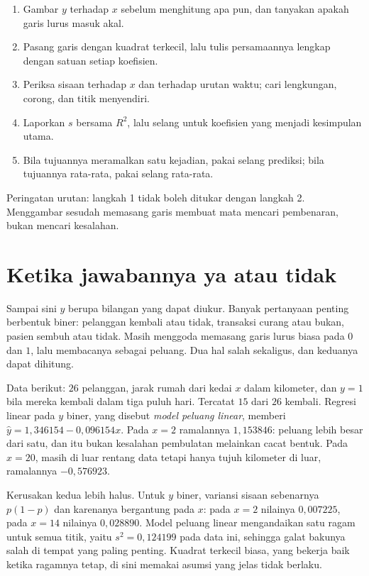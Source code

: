 \begin{resep}
\begin{enumerate}
  \item Gambar $y$ terhadap $x$ sebelum menghitung apa pun, dan tanyakan apakah garis
        lurus masuk akal.
  \item Pasang garis dengan kuadrat terkecil, lalu tulis persamaannya lengkap dengan
        satuan setiap koefisien.
  \item Periksa sisaan terhadap $x$ dan terhadap urutan waktu; cari lengkungan,
        corong, dan titik menyendiri.
  \item Laporkan $s$ bersama $R^2$, lalu selang untuk koefisien yang menjadi
        kesimpulan utama.
  \item Bila tujuannya meramalkan satu kejadian, pakai selang prediksi; bila tujuannya
        rata-rata, pakai selang rata-rata.
\end{enumerate}
Peringatan urutan: langkah 1 tidak boleh ditukar dengan langkah 2. Menggambar sesudah
memasang garis membuat mata mencari pembenaran, bukan mencari kesalahan.
\end{resep}

\section{Ketika jawabannya ya atau tidak}

Sampai sini $y$ berupa bilangan yang dapat diukur. Banyak pertanyaan penting berbentuk
biner: pelanggan kembali atau tidak, transaksi curang atau bukan, pasien sembuh atau
tidak. Masih menggoda memasang garis lurus biasa pada $0$ dan $1$, lalu membacanya
sebagai peluang. Dua hal salah sekaligus, dan keduanya dapat dihitung.

Data berikut: $26$ pelanggan, jarak rumah dari kedai $x$ dalam kilometer, dan $y=1$ bila
mereka kembali dalam tiga puluh hari. Tercatat $15$ dari $26$ kembali. Regresi linear
pada $y$ biner, yang disebut \emph{model peluang linear}, memberi
$\hat y=1{,}346154-0{,}096154x$. Pada $x=2$ ramalannya $1{,}153846$: peluang lebih besar
dari satu, dan itu bukan kesalahan pembulatan melainkan cacat bentuk. Pada $x=20$,
masih di luar rentang data tetapi hanya tujuh kilometer di luar, ramalannya $-0{,}576923$.

Kerusakan kedua lebih halus. Untuk $y$ biner, variansi sisaan sebenarnya $p(1-p)$ dan
karenanya bergantung pada $x$: pada $x=2$ nilainya $0{,}007225$, pada $x=14$ nilainya
$0{,}028890$. Model peluang linear mengandaikan satu ragam untuk semua titik, yaitu
$s^2=0{,}124199$ pada data ini, sehingga galat bakunya salah di tempat yang paling
penting.
Kuadrat terkecil biasa, yang bekerja baik ketika ragamnya tetap, di sini memakai
asumsi yang jelas tidak berlaku.

